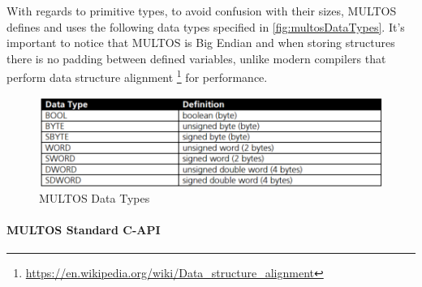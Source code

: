 With regards to primitive types, to avoid confusion with their sizes, MULTOS defines and uses the following data types specified in \autoref{fig:multosDataTypes}. It's important to notice that MULTOS is Big Endian
and when storing structures there is no padding between defined variables, unlike modern compilers that perform data structure alignment \footnote{\url{https://en.wikipedia.org/wiki/Data_structure_alignment}} for performance.

\begin{figure}[bth]
	\begin{center}
		\includegraphics[width=\linewidth]{gfx/multosDataTypes}
	\end{center}
	\caption{MULTOS Data Types}
	\label{fig:multosDataTypes}
\end{figure}


\paragraph{MULTOS Standard C-API}

